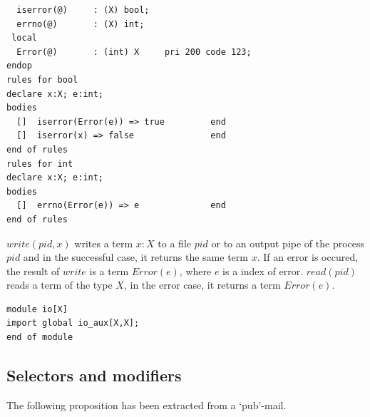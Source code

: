 \documentclass{article}
\begin{document}
{{{\begin{verbatim}
  iserror(@)     : (X) bool;
  errno(@)       : (X) int;
 local
  Error(@)       : (int) X     pri 200 code 123;
endop
rules for bool
declare x:X; e:int;
bodies
  []  iserror(Error(e)) => true         end
  []  iserror(x) => false               end
end of rules
rules for int
declare x:X; e:int;
bodies
  []  errno(Error(e)) => e              end
end of rules
\end{verbatim}
}
%
$write(pid,x)$ writes a term $x:X$ to a file $pid$ or to an output pipe of the
process $pid$ and in the successful
case, it returns the same term $x$. If an error is occured, the result of $write$ is
a term $Error(e)$, where $e$ is a index of error.
$read(pid)$ reads a term of the type $X$, in the error case, it returns a term $Error(e)$.

\bigskip 

{\scriptsize
\begin{verbatim}
module io[X]
import global io_aux[X,X];
end of module
\end{verbatim}
}
}
}
\subsection{Selectors and modifiers}

The following proposition has been extracted from a `pub'-mail.
\end{document}
